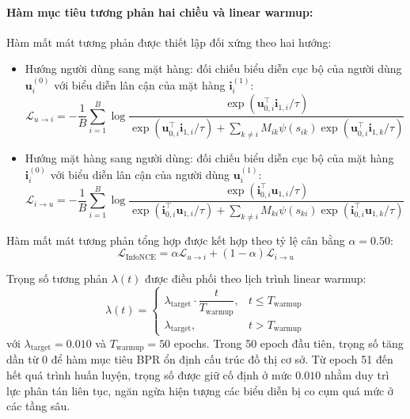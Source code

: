 \paragraph{Hàm mục tiêu tương phản hai chiều và linear warmup:}
Hàm mất mát tương phản được thiết lập đối xứng theo hai hướng:
\begin{itemize}[leftmargin=*]
    \item Hướng người dùng sang mặt hàng: đối chiếu biểu diễn cục bộ của người dùng $\mathbf{u}_i^{(0)}$ với biểu diễn lân cận của mặt hàng $\mathbf{i}_i^{(1)}$:
    \begin{equation}
    \mathcal{L}_{u \to i} = -\frac{1}{B} \sum_{i=1}^B \log \frac{\exp(\mathbf{u}_{0,i}^\top \mathbf{i}_{1,i} / \tau)}{\exp(\mathbf{u}_{0,i}^\top \mathbf{i}_{1,i} / \tau) + \sum_{k \ne i} M_{ik} \psi(s_{ik}) \exp(\mathbf{u}_{0,i}^\top \mathbf{i}_{1,k} / \tau)}
    \end{equation}
    \item Hướng mặt hàng sang người dùng: đối chiếu biểu diễn cục bộ của mặt hàng $\mathbf{i}_i^{(0)}$ với biểu diễn lân cận của người dùng $\mathbf{u}_i^{(1)}$:
    \begin{equation}
    \mathcal{L}_{i \to u} = -\frac{1}{B} \sum_{i=1}^B \log \frac{\exp(\mathbf{i}_{0,i}^\top \mathbf{u}_{1,i} / \tau)}{\exp(\mathbf{i}_{0,i}^\top \mathbf{u}_{1,i} / \tau) + \sum_{k \ne i} M_{ki} \psi(s_{ki}) \exp(\mathbf{i}_{0,i}^\top \mathbf{u}_{1,k} / \tau)}
    \end{equation}
\end{itemize}

Hàm mất mát tương phản tổng hợp được kết hợp theo tỷ lệ cân bằng $\alpha = 0.50$:
\begin{equation}
\mathcal{L}_{\text{InfoNCE}} = \alpha \mathcal{L}_{u \to i} + (1 - \alpha) \mathcal{L}_{i \to u}
\end{equation}

Trọng số tương phản $\lambda(t)$ được điều phối theo lịch trình linear warmup:
\begin{equation}
\lambda(t) = \begin{cases} 
\lambda_{\text{target}} \cdot \dfrac{t}{T_{\text{warmup}}}, & t \le T_{\text{warmup}} \\ 
\lambda_{\text{target}}, & t > T_{\text{warmup}} 
\end{cases}
\end{equation}
với $\lambda_{\text{target}} = 0.010$ và $T_{\text{warmup}} = 50$ epochs. Trong 50 epoch đầu tiên, trọng số tăng dần từ 0 để hàm mục tiêu BPR ổn định cấu trúc đồ thị cơ sở. Từ epoch 51 đến hết quá trình huấn luyện, trọng số được giữ cố định ở mức $0.010$ nhằm duy trì lực phân tán liên tục, ngăn ngừa hiện tượng các biểu diễn bị co cụm quá mức ở các tầng sâu.

